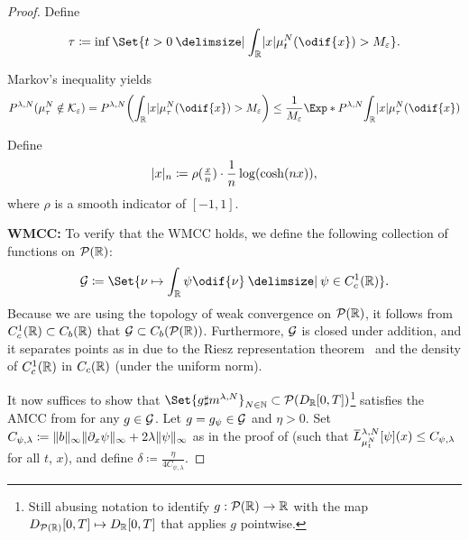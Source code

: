 \begin{proof}
  Define
  \begin{equation}
    \tau \coloneqq \inf\Set{ t > 0 \given \int_\potspace \abs{x} \mu_t^N(\odif{x}) > M_\eps }.
  \end{equation}

  Markov's inequality yields
  \begin{equation}
    P^{\lambda, N} (\mu_\tau^N \notin \cK_\eps)
    = P^{\lambda, N} \br*{ \int_\potspace \abs{x} \mu_\tau^N(\odif{x}) > M_\eps }
    \leq \frac{1}{M_\eps} \Exp*{P^{\lambda, N}}{\int_\potspace \abs{x} \mu_\tau^N(\odif{x})}
  \end{equation}

  Define
  \begin{equation}
    \abs{x}_n \coloneqq \rho(\tfrac{x}{n}) \cdot \frac{1}{n} \log(\cosh(n x)),    %
  \end{equation}
  where \( \rho \) is a smooth indicator of \( [-1,1] \).

  \bigskip

  \textbf{WMCC:}
  To verify that the WMCC holds, we define the following collection of functions on \(\mathcal{P}(\mathbb{R})\):
  \begin{equation}
    \cG \coloneqq \Set{\nu \mapsto \int_\potspace \psi \odif{\nu} \given \psi \in C_c^1(\potspace)}.
  \end{equation}
  Because we are using the topology of weak convergence on \(\mathcal{P}(\mathbb{R})\), it follows from \(C_c^1(\mathbb{R}) \subset C_b(\mathbb{R})\) that \(\mathcal{G} \subset C_b(\mathcal{P}(\mathbb{R}))\).
  Furthermore, \( \mathcal{G} \) is closed under addition, and it separates points as in  due to the Riesz representation theorem~\cite[Thm. 2.14]{rudinRealComplexAnalysis2013} and the density of \( C_c^1(\mathbb{R}) \) in \( C_c(\mathbb{R}) \) (under the uniform norm).

  It now suffices to show that \( \Set{g \sharp \lawmu^{\lambda, N}}_{N\in\bN} \subset \cP(D_{\potspace}[0,T])\)\footnote{Still abusing notation to identify \( g : \mathcal{P}(\mathbb{R}) \to \mathbb{R} \) with the map \( D_{\mathcal{P}(\mathbb{R})}[0,T] \mapsto D_{\mathbb{R}}[0,T] \) that applies \( g \) pointwise.} satisfies the AMCC from  for any \( g \in \mathcal{G} \).
  Let \( g = g_\psi \in \mathcal{G} \) and \( \eta > 0 \).
  Set \( C_{\psi, \lambda} \coloneqq \lVert b\rVert_\infty \lVert\partial_x \psi\rVert_\infty + 2\lambda \lVert\psi\rVert_\infty \) as in the proof of  (such that \( \ol{L}_{\mu_t^N}^{\lambda,N} [\psi] (x) \leq C_{\psi, \lambda} \) for all \( t \), \( x \)), and define \(\delta \coloneqq \frac{\eta}{4C_{\psi, \lambda}}\).


\end{proof}
